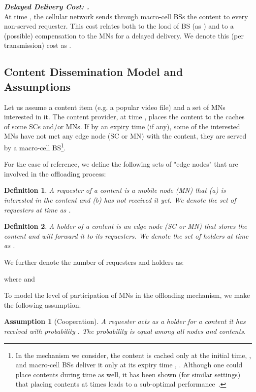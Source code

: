 \documentclass[10pt,conference,letterpaper]{IEEEtran}
\newtheorem{definition}{Definition}
\newtheorem{assumption}{Assumption}
\begin{document}
\noindent \textbf{\textit{ Delayed Delivery Cost: .}}\\
At time , the cellular network sends through macro-cell BSs the content to every non-served requester. This cost relates both to the load of BS (as ) and to a (possible) compensation to the MNs for a delayed delivery. We denote this (per transmission) cost as .


\subsection{Content Dissemination Model and Assumptions}\label{sec:analysis-preliminaries}
Let us assume a content item (e.g. a popular video file) and a set of MNs interested in it. The content provider, at time , places the content to the caches of some SCs and/or MNs. If by an expiry time  (if any), some of the interested MNs have not met any edge node (SC or MN) with the content, they are served by a macro-cell BS\footnote{In the mechanism we consider, the content is cached only at the initial time, , and macro-cell BSs deliver it only at its expiry time , . Although one could place contents during time  as well, it has been shown (for similar settings) that placing contents at times  leads to a sub-optimal performance~\cite{offloading-control-theory,fluid-limit-mass2012}.}.

For the ease of reference, we define the following sets of "edge nodes" that are involved in the offloading process: 
\begin{definition}
A \emph{requester} of a content is a mobile node (MN) that (a) is interested in the content and (b) has not received it yet. We denote the set of requesters at time  as .
\end{definition}
\begin{definition}
A \emph{holder} of a content is an edge node (SC or MN) that stores the content and will forward it to its requesters. We denote the set of holders at time  as .
\end{definition}
\noindent We further denote the number of requesters and holders as:

where  and 

To model the level of participation of MNs in the offloading mechanism, we make the following assumption.
\begin{assumption}[Cooperation]\label{ass:cooperation} A requester acts as a holder for a content it has received with probability . The probability  is equal among all nodes and contents.
\end{assumption}
\end{document}
